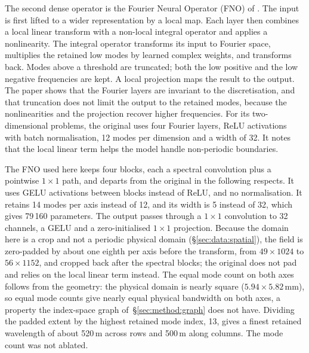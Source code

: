 The second dense operator is the Fourier Neural Operator (FNO) of \citet{Li2021}. The input is first lifted to a wider representation by a local
map. Each layer then combines a local linear transform with a non-local
integral operator and applies a nonlinearity. The integral operator
transforms its input to Fourier space, multiplies the retained low modes by
learned complex weights, and transforms back. Modes above a threshold are
truncated; both the low positive and the low negative frequencies are kept.
A local projection maps the result to the output. The paper shows that the
Fourier layers are invariant to the discretisation, and that truncation does
not limit the output to the retained modes, because the nonlinearities and
the projection recover higher frequencies. For its two-dimensional problems,
the original uses four Fourier layers, ReLU activations with batch
normalisation, 12 modes per dimension and a width of 32. It notes that the
local linear term helps the model handle non-periodic boundaries.

The FNO used here keeps four blocks, each a spectral convolution plus a
pointwise $1 \times 1$ path, and departs from the original in the
following respects. It uses GELU activations between blocks instead of ReLU,
and no normalisation. It retains 14 modes per axis instead of 12, and its
width is 5 instead of 32, which gives 79\,160 parameters. The output passes
through a $1 \times 1$ convolution to 32 channels, a GELU and a
zero-initialised $1 \times 1$ projection. Because the domain here is a crop
and not a periodic physical domain (\S\ref{sec:data:spatial}), the field is
zero-padded by about one eighth per axis before the transform, from
$49 \times 1024$ to $56 \times 1152$, and cropped back after the spectral
blocks; the original does not pad and relies on the local linear term
instead. The equal mode count on both axes follows from the geometry: the
physical domain is nearly square ($5.94 \times 5.82$\,mm), so equal mode
counts give nearly equal physical bandwidth on both axes, a property the
index-space graph of~\S\ref{sec:method:graph} does not have. Dividing the
padded extent by the highest retained mode index, 13, gives a finest
retained wavelength of about 520\,\textmu{}m across rows and
500\,\textmu{}m along columns. The mode count was not ablated.

